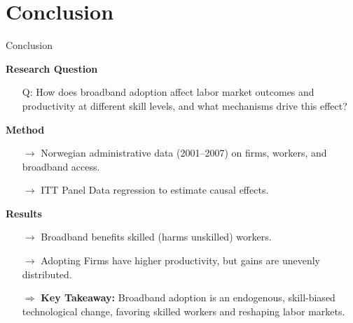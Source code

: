 \documentclass[compress, aspectratio=169, xcolor=dvipsnames]{beamer}
\begin{document}
\section{Conclusion}
\begin{frame}{Conclusion}

\textbf{Research Question} \\
\begin{itemize}
	\item[Q:] How does broadband adoption affect labor market outcomes and productivity at different skill levels, and what mechanisms drive this effect?
\end{itemize}

\textbf{Method} \\
\begin{itemize}
	\item[$\rightarrow$] Norwegian administrative data (2001–2007) on firms, workers, and broadband access.
	\item[$\rightarrow$] ITT Panel Data regression to estimate causal effects.
\end{itemize}

\textbf{Results} \\

\begin{itemize}
	\item[$\rightarrow$] Broadband benefits skilled (harms unskilled) workers.
	\item[$\rightarrow$] Adopting Firms have higher productivity, but gains are unevenly distributed.
	\item[$\Rightarrow$] \textbf{Key Takeaway:} Broadband adoption is an endogenous, skill-biased technological change, favoring skilled workers and reshaping labor markets.
\end{itemize}


\end{frame}
\end{document}
